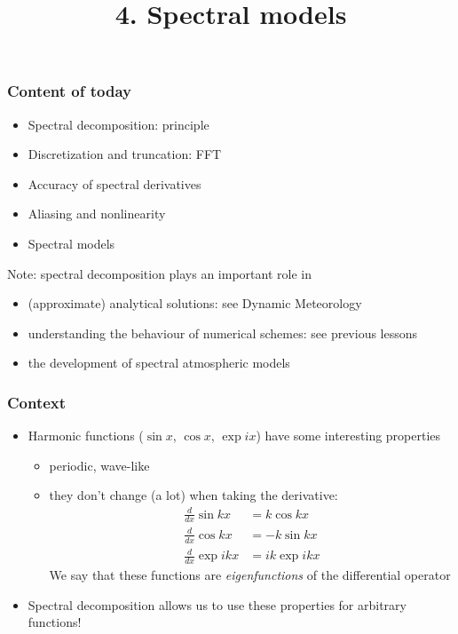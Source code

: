 \documentclass[aspectratio=43,9pt]{beamer}
\title{4. Spectral models}%
\begin{document}
%
%
\begin{frame}[plain]
	\titlepage
\end{frame}
%
%
\begin{frame}
	\frametitle{Content of today}
	\vfill\begin{itemize}
		\item Spectral decomposition: principle\vfill
		\item Discretization and truncation: FFT\vfill
		\item Accuracy of spectral derivatives\vfill
		\item Aliasing and nonlinearity\vfill
		\item Spectral models
	\end{itemize}\vfill
\pause
	\vfill\par
	Note: spectral decomposition plays an important role in 
	\begin{itemize}
		\item (approximate) analytical solutions: see Dynamic Meteorology
		\item understanding the behaviour of numerical schemes: see previous lessons
		\item the development of spectral atmospheric models
	\end{itemize}\vfill
\end{frame}
%
%
\begin{frame}
	\frametitle{Context}
	\vfill\begin{itemize}
		\item Harmonic functions ($\sin x$, $\cos x$, $\exp i x$) have some interesting properties\vfill
			\begin{itemize}
				\item periodic, wave-like\vfill
				\item they don't change (a lot) when taking the derivative:
					\begin{align*}
						\frac{d}{dx}\sin k x&=k\cos k x\\
						\frac{d}{dx}\cos k x&=-k\sin k x\\
						\frac{d}{dx}\exp i k x&= i k \exp i k x
					\end{align*}
					We say that these functions are \emph{eigenfunctions} of the differential operator\vfill
			\end{itemize}
		\item Spectral decomposition allows us to use these properties for arbitrary functions!
	\end{itemize}\vfill
\end{frame}
\end{document}
